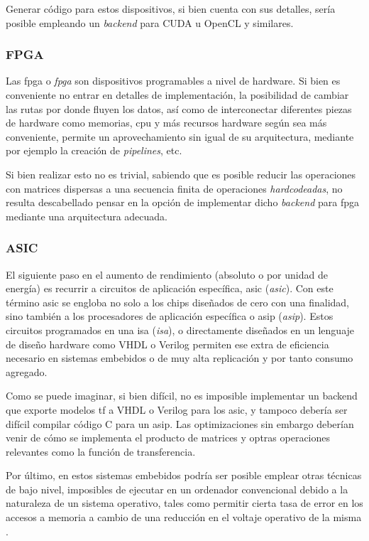 Generar código para estos dispositivos, si bien cuenta con sus detalles, sería posible empleando un \textit{backend} para CUDA u OpenCL y similares.

\subsubsection{FPGA}
\label{sssec:heterogeneas_fpga}
Las \acrshort{fpga} o \textit{\acrlong{fpga}} son dispositivos programables a nivel de hardware. Si bien es conveniente no entrar en detalles de implementación, la posibilidad de cambiar las rutas por donde fluyen los datos, así como de interconectar diferentes piezas de hardware como memorias, \acrshort{cpu} y más recursos hardware según sea más conveniente, permite un aprovechamiento sin igual de su arquitectura, mediante por ejemplo la creación de \textit{pipelines}, etc.

Si bien realizar esto no es trivial, sabiendo que es posible reducir las operaciones con matrices dispersas a una secuencia finita de operaciones \textit{hardcodeadas}, no resulta descabellado pensar en la opción de implementar dicho \textit{backend} para \acrshort{fpga} mediante una arquitectura adecuada.

\subsubsection{ASIC}
\label{sssec:heterogeneas_asic}
El siguiente paso en el aumento de rendimiento (absoluto o por unidad de energía) es recurrir a circuitos de aplicación específica, \acrshort{asic} (\textit{\acrlong{asic}}). Con este término \acrshort{asic} se engloba no solo a los chips diseñados de cero con una finalidad, sino también a los procesadores de aplicación específica o \acrshort{asip} (\textit{\acrlong{asip}}). Estos circuitos programados en una \acrshort{isa} (\textit{\acrlong{isa}}), o directamente diseñados en un lenguaje de diseño hardware como VHDL o Verilog permiten ese extra de eficiencia necesario en sistemas embebidos o de muy alta replicación y por tanto consumo agregado.

Como se puede imaginar, si bien difícil, no es imposible implementar un backend que exporte modelos \acrlong{tf} a VHDL o Verilog para los \acrshort{asic}, y tampoco debería ser difícil compilar código C para un \acrshort{asip}. Las optimizaciones sin embargo deberían venir de cómo se implementa el producto de matrices y optras operaciones relevantes como la función de transferencia.

Por último, en estos sistemas embebidos podría ser posible emplear otras técnicas de bajo nivel, imposibles de ejecutar en un ordenador convencional debido a la naturaleza de un sistema operativo, tales como permitir cierta tasa de error en los accesos a memoria a cambio de una reducción en el voltaje operativo de la misma \cite{koppula2019eden}.